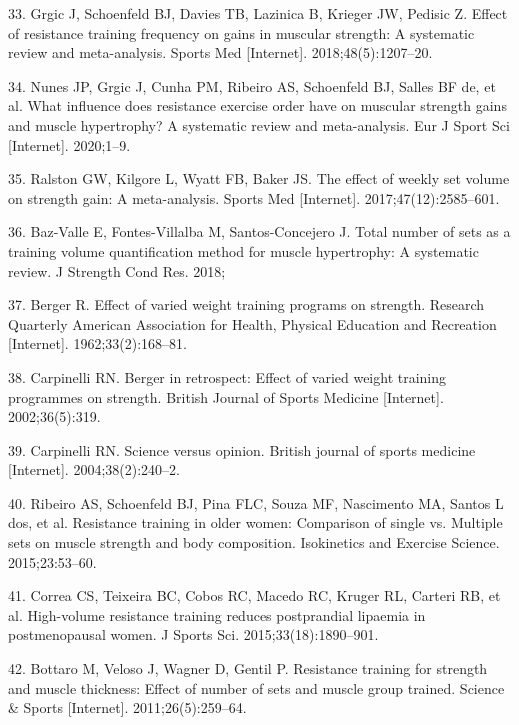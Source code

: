 \documentclass[twoside,10pt]{gihclass} %
\begin{document}
\leavevmode\hypertarget{ref-RN2570}{}%
33. Grgic J, Schoenfeld BJ, Davies TB, Lazinica B, Krieger JW, Pedisic Z. Effect of resistance training frequency on gains in muscular strength: A systematic review and meta-analysis. Sports Med {[}Internet{]}. 2018;48(5):1207--20.

\leavevmode\hypertarget{ref-RN2591}{}%
34. Nunes JP, Grgic J, Cunha PM, Ribeiro AS, Schoenfeld BJ, Salles BF de, et al. What influence does resistance exercise order have on muscular strength gains and muscle hypertrophy? A systematic review and meta-analysis. Eur J Sport Sci {[}Internet{]}. 2020;1--9.

\leavevmode\hypertarget{ref-RN2492}{}%
35. Ralston GW, Kilgore L, Wyatt FB, Baker JS. The effect of weekly set volume on strength gain: A meta-analysis. Sports Med {[}Internet{]}. 2017;47(12):2585--601.

\leavevmode\hypertarget{ref-RN2130}{}%
36. Baz-Valle E, Fontes-Villalba M, Santos-Concejero J. Total number of sets as a training volume quantification method for muscle hypertrophy: A systematic review. J Strength Cond Res. 2018;

\leavevmode\hypertarget{ref-RN1476}{}%
37. Berger R. Effect of varied weight training programs on strength. Research Quarterly American Association for Health, Physical Education and Recreation {[}Internet{]}. 1962;33(2):168--81.

\leavevmode\hypertarget{ref-RN2568}{}%
38. Carpinelli RN. Berger in retrospect: Effect of varied weight training programmes on strength. British Journal of Sports Medicine {[}Internet{]}. 2002;36(5):319.

\leavevmode\hypertarget{ref-RN2201}{}%
39. Carpinelli RN. Science versus opinion. British journal of sports medicine {[}Internet{]}. 2004;38(2):240--2.

\leavevmode\hypertarget{ref-RN2465}{}%
40. Ribeiro AS, Schoenfeld BJ, Pina FLC, Souza MF, Nascimento MA, Santos L dos, et al. Resistance training in older women: Comparison of single vs. Multiple sets on muscle strength and body composition. Isokinetics and Exercise Science. 2015;23:53--60.

\leavevmode\hypertarget{ref-RN2464}{}%
41. Correa CS, Teixeira BC, Cobos RC, Macedo RC, Kruger RL, Carteri RB, et al. High-volume resistance training reduces postprandial lipaemia in postmenopausal women. J Sports Sci. 2015;33(18):1890--901.

\leavevmode\hypertarget{ref-RN2463}{}%
42. Bottaro M, Veloso J, Wagner D, Gentil P. Resistance training for strength and muscle thickness: Effect of number of sets and muscle group trained. Science \& Sports {[}Internet{]}. 2011;26(5):259--64.
\end{document}
